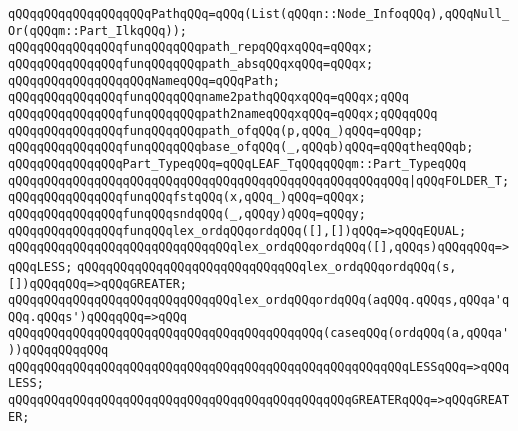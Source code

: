 \verb|qQQqqQQqqQQqqQQqqQQqPathqQQq=qQQq(List(qQQqn::Node_InfoqQQq),qQQqNull_Or(qQQqm::Part_IlkqQQq));|\newline
\newline
\verb|qQQqqQQqqQQqqQQqfunqQQqqQQqpath_repqQQqxqQQq=qQQqx;|\newline
\verb|qQQqqQQqqQQqqQQqfunqQQqqQQqpath_absqQQqxqQQq=qQQqx;|\newline
\verb|qQQqqQQqqQQqqQQqqQQqNameqQQq=qQQqPath;|\newline
\newline
\verb|qQQqqQQqqQQqqQQqfunqQQqqQQqname2pathqQQqxqQQq=qQQqx;qQQq|\newline
\verb|qQQqqQQqqQQqqQQqfunqQQqqQQqpath2nameqQQqxqQQq=qQQqx;qQQqqQQq|\newline
\newline
\verb|qQQqqQQqqQQqqQQqfunqQQqqQQqpath_ofqQQq(p,qQQq_)qQQq=qQQqp;|\newline
\newline
\verb|qQQqqQQqqQQqqQQqfunqQQqqQQqbase_ofqQQq(_,qQQqb)qQQq=qQQqtheqQQqb;|\newline
\newline
\verb|qQQqqQQqqQQqqQQqPart_TypeqQQq=qQQqLEAF_TqQQqqQQqm::Part_TypeqQQq|\newline
\verb|qQQqqQQqqQQqqQQqqQQqqQQqqQQqqQQqqQQqqQQqqQQqqQQqqQQqqQQq|\verb#|qQQqFOLDER_T;#\newline
\newline
\verb|qQQqqQQqqQQqqQQqfunqQQqfstqQQq(x,qQQq_)qQQq=qQQqx;|\newline
\verb|qQQqqQQqqQQqqQQqfunqQQqsndqQQq(_,qQQqy)qQQq=qQQqy;|\newline
\newline
\verb|qQQqqQQqqQQqqQQqfunqQQqlex_ordqQQqordqQQq([],[])qQQq=>qQQqEQUAL;|\newline
\verb|qQQqqQQqqQQqqQQqqQQqqQQqqQQqqQQqlex_ordqQQqordqQQq([],qQQqs)qQQqqQQq=>qQQqLESS;|\newline
\verb|qQQqqQQqqQQqqQQqqQQqqQQqqQQqqQQqlex_ordqQQqordqQQq(s,[])qQQqqQQq=>qQQqGREATER;|\newline
\verb|qQQqqQQqqQQqqQQqqQQqqQQqqQQqqQQqlex_ordqQQqordqQQq(aqQQq.qQQqs,qQQqa'qQQq.qQQqs')qQQqqQQq=>qQQq|\newline
\verb|qQQqqQQqqQQqqQQqqQQqqQQqqQQqqQQqqQQqqQQqqQQq(caseqQQq(ordqQQq(a,qQQqa'))qQQqqQQqqQQq|\newline
\verb|qQQqqQQqqQQqqQQqqQQqqQQqqQQqqQQqqQQqqQQqqQQqqQQqqQQqqQQqLESSqQQq=>qQQqLESS;|\newline
\verb|qQQqqQQqqQQqqQQqqQQqqQQqqQQqqQQqqQQqqQQqqQQqqQQqGREATERqQQq=>qQQqGREATER;|\newline
